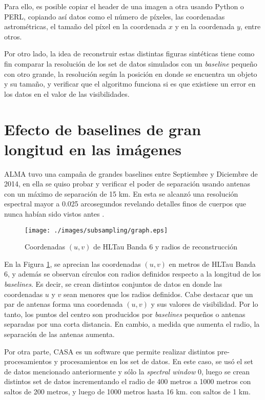 Para ello, es posible copiar el header de una imagen a otra usando Python o PERL, copiando así datos como el número de píxeles, las coordenadas astrométricas, el tamaño del píxel en la coordenada $x$ y en la coordenada $y$, entre otros.

Por otro lado, la idea de reconstruir estas distintas figuras sintéticas tiene como fin comparar la resolución de los set de datos simulados con un \textit{baseline} pequeño con otro grande, la resolución según la posición en donde se encuentra un objeto y su tamaño, y verificar que el algoritmo funciona si es que existiese un error en los datos en el valor de las visibilidades.



\section{Efecto de baselines de gran longitud en las imágenes}

ALMA tuvo una campaña de grandes baselines entre Septiembre y Diciembre de 2014, en ella se quiso probar y verificar el poder de separación usando antenas con un máximo de separación de 15 km. En esta se alcanzó una resolución espectral mayor a 0.025 arcosegundos revelando detalles finos de cuerpos que nunca habían sido vistos antes \citep{longbaselines}.

\begin{figure}[h!]
\centering
\texttt{[image: ./images/subsampling/graph.eps]}
\caption{Coordenadas $(u,v)$ de HLTau Banda 6 y radios de reconstrucción}
\label{fig:uv_radios}
\end{figure}

En la Figura \ref{fig:uv_radios}, se aprecian las coordenadas $(u,v)$ en metros de HLTau Banda 6, y además se observan círculos con radios definidos respecto a la longitud de los \textit{baselines}. Es decir, se crean distintos conjuntos de datos en donde las coordenadas $u$ y $v$ sean menores que los radios definidos. Cabe destacar que un par de antenas forma una coordenada $(u,v)$ y sus valores de visibilidad. Por lo tanto, los puntos del centro son producidos por \textit{baselines} pequeños o antenas separadas por una corta distancia. En cambio, a medida que aumenta el radio, la separación de las antenas aumenta.

Por otra parte, CASA \citep{casa} es un software que permite realizar distintos pre-procesamientos y procesamientos en los set de datos. En este caso, se usó el set de datos mencionado anteriormente y sólo la \textit{spectral window} 0, luego se crean distintos set de datos incrementando el radio de 400 metros a 1000 metros con saltos de 200 metros, y luego de 1000 metros hasta 16 km. con saltos de 1 km.


